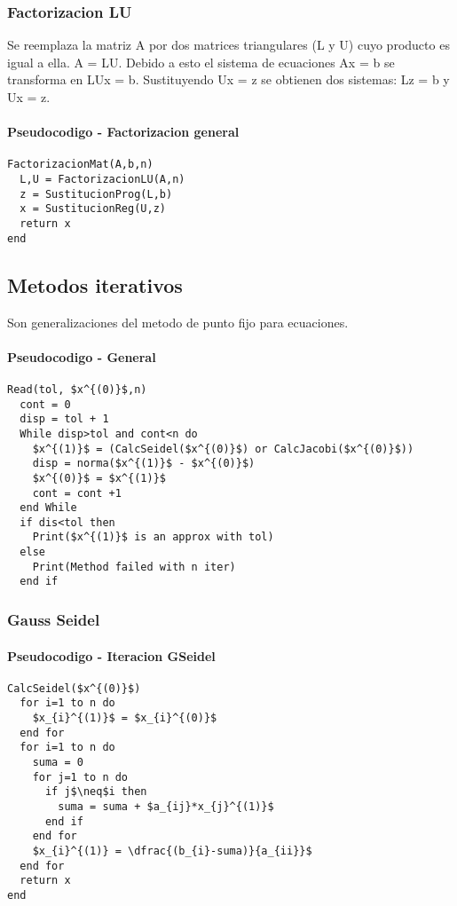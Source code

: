 \documentclass[11pt]{article}
\begin{document}
\subsubsection{Factorizacion LU}
Se reemplaza la matriz A por dos matrices triangulares (L y U) cuyo producto es igual a ella. A = LU. Debido a esto el sistema de ecuaciones Ax = b se transforma en LUx = b. Sustituyendo Ux = z se obtienen dos sistemas: Lz = b y Ux = z.
\paragraph{Pseudocodigo - Factorizacion general\\}
\begin{lstlisting}[frame=single, mathescape=true]
FactorizacionMat(A,b,n)
  L,U = FactorizacionLU(A,n)
  z = SustitucionProg(L,b)
  x = SustitucionReg(U,z)
  return x
end
\end{lstlisting}  
\subsection{Metodos iterativos}
Son generalizaciones del metodo de punto fijo para ecuaciones.
\paragraph{Pseudocodigo - General\\}
\begin{lstlisting}[frame=single, mathescape=true]
  Read(tol, $x^{(0)}$,n)
  cont = 0
  disp = tol + 1
  While disp>tol and cont<n do
    $x^{(1)}$ = (CalcSeidel($x^{(0)}$) or CalcJacobi($x^{(0)}$))
    disp = norma($x^{(1)}$ - $x^{(0)}$)
    $x^{(0)}$ = $x^{(1)}$
    cont = cont +1
  end While
  if dis<tol then
    Print($x^{(1)}$ is an approx with tol)
  else
    Print(Method failed with n iter)
  end if
\end{lstlisting}


\subsubsection{Gauss Seidel}
\paragraph{Pseudocodigo - Iteracion GSeidel\\}
\begin{lstlisting}[frame=single, mathescape=true]
CalcSeidel($x^{(0)}$)
  for i=1 to n do
    $x_{i}^{(1)}$ = $x_{i}^{(0)}$
  end for
  for i=1 to n do
    suma = 0
    for j=1 to n do
      if j$\neq$i then
        suma = suma + $a_{ij}*x_{j}^{(1)}$
      end if
    end for
    $x_{i}^{(1)} = \dfrac{(b_{i}-suma)}{a_{ii}}$
  end for
  return x
end
\end{lstlisting}  
\end{document}
